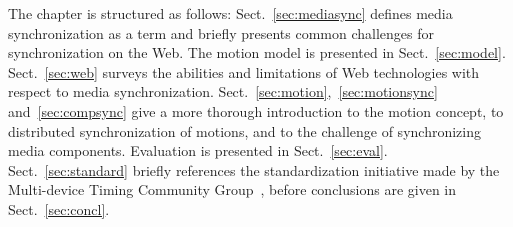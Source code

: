 The chapter is structured as follows: Sect.~\ref{sec:mediasync} defines media
synchronization as a term and briefly presents common challenges for
synchronization on the Web. The motion model is presented in
Sect.~\ref{sec:model}. Sect.~\ref{sec:web} surveys the abilities and limitations of Web technologies with respect to media synchronization.
Sect.~\ref{sec:motion},~\ref{sec:motionsync} and~\ref{sec:compsync} give a
more thorough introduction to the motion concept, to distributed
synchronization of motions, and to the challenge of synchronizing media
components. Evaluation is presented in Sect.~\ref{sec:eval}.
Sect.~\ref{sec:standard} briefly references the standardization initiative
made by the Multi-device Timing Community Group~\cite{mtcg}, before
conclusions are given in Sect.~\ref{sec:concl}.
